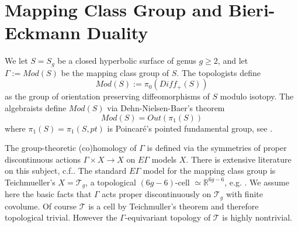 \documentclass[12pt]{amsart}
\theoremstyle{definition}
\theoremstyle{remark}
\newcommand{\bR}{\mathbb{R}}
\newcommand{\sT}{\mathscr{T}}
\newcommand{\sZ}{\mathscr{Z}}
\begin{document}



\section{Mapping Class Group and Bieri-Eckmann Duality}\label{sec1}

We let $S=S_g$ be a closed hyperbolic surface of genus $g \geq 2$, and let $\Gamma:=Mod(S)$ be the mapping class group of $S$. The topologists define $$Mod(S):=\pi_0(Diff_+(S))$$ as the group of orientation preserving diffeomorphisms of $S$ modulo isotopy. The algebraists define $Mod(S)$ via Dehn-Nielsen-Baer's theorem $$Mod(S)=Out(\pi_1(S))$$ where $\pi_1(S)=\pi_1(S, pt)$ is Poincar\'e's pointed fundamental group, see \cite{primer}.
 
 
 








The group-theoretic (co)homology of $\Gamma$ is defined via the symmetries of proper discontinuous actions $\Gamma \times X \to X$ on $E\Gamma$ models $X$. There is extensive literature on this subject, c.f.\cite{Brown}. The standard $E\Gamma$ model for the mapping class group is Teichmueller's $X=\sT_g$, a topological $(6g-6)$-cell $\simeq \bR^{6g-6}$, e.g. \cite{hubbard}. We assume here the basic facts that $\Gamma$ acts proper discontinuously on $\sT_g$ with finite covolume. Of course $\sT$ is a cell by Teichmuller's theorem and therefore topological trivial. However the $\Gamma$-equivariant topology of $\sT$ is highly nontrivial.  %
\end{document}
